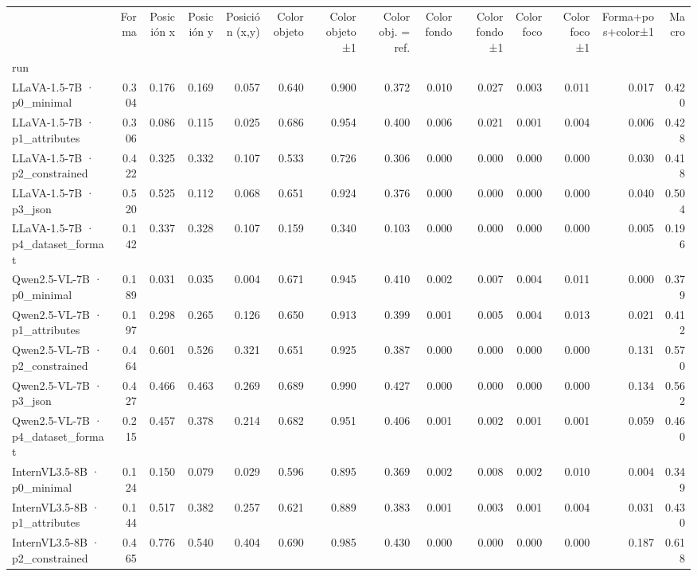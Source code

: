 \begin{tabular}{lrrrrrrrrrrrrr}
\toprule
 & Forma & Posición x & Posición y & Posición (x,y) & Color objeto & Color objeto ±1 & Color obj. = ref. & Color fondo & Color fondo ±1 & Color foco & Color foco ±1 & Forma+pos+color±1 & Macro \\
run &  &  &  &  &  &  &  &  &  &  &  &  &  \\
\midrule
LLaVA-1.5-7B · p0\_minimal & 0.304 & 0.176 & 0.169 & 0.057 & 0.640 & 0.900 & 0.372 & 0.010 & 0.027 & 0.003 & 0.011 & 0.017 & 0.420 \\
LLaVA-1.5-7B · p1\_attributes & 0.306 & 0.086 & 0.115 & 0.025 & 0.686 & 0.954 & 0.400 & 0.006 & 0.021 & 0.001 & 0.004 & 0.006 & 0.428 \\
LLaVA-1.5-7B · p2\_constrained & 0.422 & 0.325 & 0.332 & 0.107 & 0.533 & 0.726 & 0.306 & 0.000 & 0.000 & 0.000 & 0.000 & 0.030 & 0.418 \\
LLaVA-1.5-7B · p3\_json & 0.520 & 0.525 & 0.112 & 0.068 & 0.651 & 0.924 & 0.376 & 0.000 & 0.000 & 0.000 & 0.000 & 0.040 & 0.504 \\
LLaVA-1.5-7B · p4\_dataset\_format & 0.142 & 0.337 & 0.328 & 0.107 & 0.159 & 0.340 & 0.103 & 0.000 & 0.000 & 0.000 & 0.000 & 0.005 & 0.196 \\
Qwen2.5-VL-7B · p0\_minimal & 0.189 & 0.031 & 0.035 & 0.004 & 0.671 & 0.945 & 0.410 & 0.002 & 0.007 & 0.004 & 0.011 & 0.000 & 0.379 \\
Qwen2.5-VL-7B · p1\_attributes & 0.197 & 0.298 & 0.265 & 0.126 & 0.650 & 0.913 & 0.399 & 0.001 & 0.005 & 0.004 & 0.013 & 0.021 & 0.412 \\
Qwen2.5-VL-7B · p2\_constrained & 0.464 & 0.601 & 0.526 & 0.321 & 0.651 & 0.925 & 0.387 & 0.000 & 0.000 & 0.000 & 0.000 & 0.131 & 0.570 \\
Qwen2.5-VL-7B · p3\_json & 0.427 & 0.466 & 0.463 & 0.269 & 0.689 & 0.990 & 0.427 & 0.000 & 0.000 & 0.000 & 0.000 & 0.134 & 0.562 \\
Qwen2.5-VL-7B · p4\_dataset\_format & 0.215 & 0.457 & 0.378 & 0.214 & 0.682 & 0.951 & 0.406 & 0.001 & 0.002 & 0.001 & 0.001 & 0.059 & 0.460 \\
InternVL3.5-8B · p0\_minimal & 0.124 & 0.150 & 0.079 & 0.029 & 0.596 & 0.895 & 0.369 & 0.002 & 0.008 & 0.002 & 0.010 & 0.004 & 0.349 \\
InternVL3.5-8B · p1\_attributes & 0.144 & 0.517 & 0.382 & 0.257 & 0.621 & 0.889 & 0.383 & 0.001 & 0.003 & 0.001 & 0.004 & 0.031 & 0.430 \\
InternVL3.5-8B · p2\_constrained & 0.465 & 0.776 & 0.540 & 0.404 & 0.690 & 0.985 & 0.430 & 0.000 & 0.000 & 0.000 & 0.000 & 0.187 & 0.618 \\

\end{tabular}

